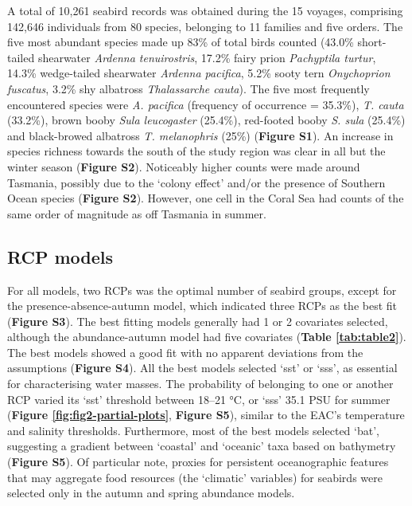 \documentclass{article}
\begin{document}
\begin{linenumbers}
A total of 10,261 seabird records was obtained during the 15 voyages, comprising 142,646 individuals from 80 species, belonging to 11 families and five orders. The five most abundant species made up 83\% of total birds counted (43.0\% short-tailed shearwater \emph{Ardenna tenuirostris}, 17.2\% fairy prion \emph{Pachyptila turtur}, 14.3\% wedge-tailed shearwater \emph{Ardenna pacifica}, 5.2\% sooty tern \emph{Onychoprion fuscatus}, 3.2\% shy albatross \emph{Thalassarche cauta}). The five most frequently encountered species were \emph{A. pacifica} (frequency of occurrence = 35.3\%), \emph{T. cauta} (33.2\%), brown booby \emph{Sula leucogaster} (25.4\%), red-footed booby \emph{S. sula} (25.4\%) and black-browed albatross \emph{T. melanophris} (25\%) (\textbf{Figure S1}). An increase in species richness towards the south of the study region was clear in all but the winter season (\textbf{Figure S2}). Noticeably higher counts were made around Tasmania, possibly due to the `colony effect' and/or the presence of Southern Ocean species (\textbf{Figure S2}). However, one cell in the Coral Sea had counts of the same order of magnitude as off Tasmania in summer.

\hypertarget{rcp-models}{%
\subsection{RCP models}\label{rcp-models}}

For all models, two RCPs was the optimal number of seabird groups, except for the presence-absence-autumn model, which indicated three RCPs as the best fit (\textbf{Figure S3}). The best fitting models generally had 1 or 2 covariates selected, although the abundance-autumn model had five covariates (\textbf{Table \ref{tab:table2}}). The best models showed a good fit with no apparent deviations from the assumptions (\textbf{Figure S4}). All the best models selected `sst' or `sss', as essential for characterising water masses. The probability of belonging to one or another RCP varied its `sst' threshold between 18--21 °C, or `sss' 35.1 PSU for summer (\textbf{Figure \ref{fig:fig2-partial-plots}}, \textbf{Figure S5}), similar to the EAC's temperature and salinity thresholds. Furthermore, most of the best models selected `bat', suggesting a gradient between `coastal' and `oceanic' taxa based on bathymetry (\textbf{Figure S5}). Of particular note, proxies for persistent oceanographic features that may aggregate food resources (the `climatic' variables) for seabirds were selected only in the autumn and spring abundance models.


\end{linenumbers}
\end{document}
